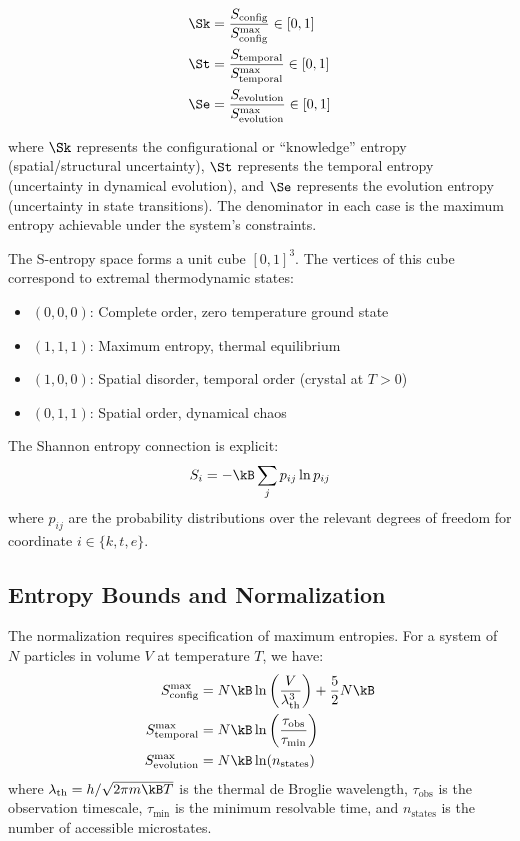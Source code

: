 \begin{align}
\Sk &= \frac{S_{\text{config}}}{S_{\text{config}}^{\max}} \in [0,1] \label{eq:Sk}\\
\St &= \frac{S_{\text{temporal}}}{S_{\text{temporal}}^{\max}} \in [0,1] \label{eq:St}\\
\Se &= \frac{S_{\text{evolution}}}{S_{\text{evolution}}^{\max}} \in [0,1] \label{eq:Se}
\end{align}

\noindent where $\Sk$ represents the configurational or ``knowledge'' entropy (spatial/structural uncertainty), $\St$ represents the temporal entropy (uncertainty in dynamical evolution), and $\Se$ represents the evolution entropy (uncertainty in state transitions). The denominator in each case is the maximum entropy achievable under the system's constraints.

The S-entropy space forms a unit cube $[0,1]^3$. The vertices of this cube correspond to extremal thermodynamic states:
\begin{itemize}
    \item $(0,0,0)$: Complete order, zero temperature ground state
    \item $(1,1,1)$: Maximum entropy, thermal equilibrium
    \item $(1,0,0)$: Spatial disorder, temporal order (crystal at $T>0$)
    \item $(0,1,1)$: Spatial order, dynamical chaos
\end{itemize}

The Shannon entropy connection \cite{shannon1948mathematical, cover2006elements} is explicit:
\begin{equation}
S_i = -\kB \sum_j p_{ij} \ln p_{ij}
\end{equation}
where $p_{ij}$ are the probability distributions over the relevant degrees of freedom for coordinate $i \in \{k, t, e\}$.

\subsection{Entropy Bounds and Normalization}

The normalization requires specification of maximum entropies. For a system of $N$ particles in volume $V$ at temperature $T$, we have:
\begin{align}
S_{\text{config}}^{\max} &= N\kB \ln\left(\frac{V}{\lambda_{\text{th}}^3}\right) + \frac{5}{2}N\kB \\
S_{\text{temporal}}^{\max} &= N\kB \ln\left(\frac{\tau_{\text{obs}}}{\tau_{\text{min}}}\right) \\
S_{\text{evolution}}^{\max} &= N\kB \ln(n_{\text{states}})
\end{align}
where $\lambda_{\text{th}} = h/\sqrt{2\pi m \kB T}$ is the thermal de Broglie wavelength, $\tau_{\text{obs}}$ is the observation timescale, $\tau_{\text{min}}$ is the minimum resolvable time, and $n_{\text{states}}$ is the number of accessible microstates.


